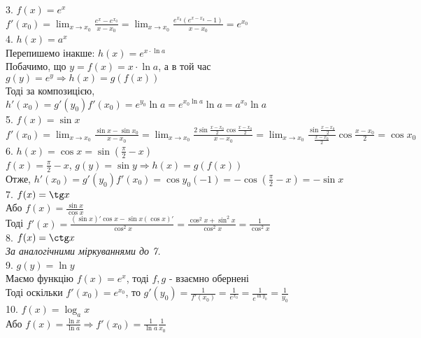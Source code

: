 \documentclass[a4paper, 14pt]{article}
\def\huge{\displaystyle}
\theoremstyle{theoremdd}
\theoremstyle{theoremdd}
\theoremstyle{theoremdd}
\theoremstyle{theoremdd}
\theoremstyle{theoremdd}
\theoremstyle{theoremdd}
\theoremstyle{theoremdd}
\theoremstyle{theoremdd}
\begin{document}
3. $f(x) = e^x$\\
$f'(x_0) = \huge \lim_{x \to x_0} \frac{e^x-e^{x_0}}{x-x_0} = \lim_{x \to x_0} \frac{e^{x_0}(e^{x-x_0}-1)}{x-x_0} = e^{x_0}$
\bigskip \\

4. $h(x) = a^x$\\
Перепишемо інакше: $h(x) = e^{x \cdot \ln a}$\\
Побачимо, що $y = f(x) = x \cdot \ln a$, а в той час $g(y) = e^y \Rightarrow h(x)=g(f(x))$\\
Тоді за композицією, $h'(x_0) = g'(y_0) f'(x_0) = e^{y_0} \ln a = e^{x_0 \ln a} \ln a = a^{x_0} \ln a$
\bigskip \\

5. $f(x) = \sin x$\\
$f'(x_0) = \huge \lim_{x \to x_0} \frac{\sin x - \sin x_0}{x-x_0} = \lim_{x \to x_0} \frac{2 \sin \frac{x-x_0}{2} \cos \frac{x-x_0}{2}}{x-x_0} = \lim_{x \to x_0} \frac{\sin \frac{x-x_0}{2}}{\frac{x-x_0}{2}} \cos \frac{x-x_0}{2} = \cos x_0$
\bigskip \\

6. $h(x) = \huge \cos x = \sin \left(\frac{\pi}{2} - x \right)$\\
$f(x) = \huge \frac{\pi}{2} - x$, $g(y) = \sin y \Rightarrow h(x) = g(f(x))$\\
Отже, $h'(x_0) = g'(y_0)f'(x_0) = \cos y_0 (-1) = \huge -\cos \left(\frac{\pi}{2} - x \right) = -\sin x$
\bigskip \\

7. $f(x) = \tg x$\\
Або $f(x) = \huge \frac{\sin x}{\cos x}$\\
Тоді $f'(x) = \huge \frac{(\sin x)' \cos x - \sin x (\cos x)'}{\cos^2 x} = \frac{\cos^2 x + \sin^2x}{\cos^2 x} = \frac{1}{\cos^2 x}$
\bigskip \\

8. $f(x) = \ctg x$\\
\textit{За аналогічними міркуваннями до 7.}
\bigskip \\

9. $g(y) = \ln y$\\
Маємо функцію $f(x) = e^x$, тоді $f,g$ - взаємно обернені\\
Тоді оскільки $f'(x_0) = e^{x_0}$, то $g'(y_0) = \huge \frac{1}{f'(x_0)} = \frac{1}{e^{x_0}} = \frac{1}{e^{\ln y_0}} = \frac{1}{y_0}$
\bigskip \\

10. $f(x) = \log_a x$\\
Або $f(x) = \huge \frac{\ln x}{\ln a} \Rightarrow f'(x_0) = \frac{1}{\ln a} \frac{1}{x_0}$
\bigskip \\
\end{document}
